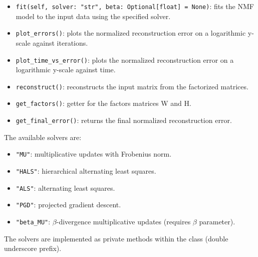 \begin{itemize}
    \item \texttt{fit(self, solver: "str", beta: Optional[float] = None)}: fits the NMF model to the input data using the specified solver.
    \item \texttt{plot\_errors()}: plots the normalized reconstruction error on a logarithmic y-scale against iterations.
    \item \texttt{plot\_time\_vs\_error()}: plots the normalized reconstruction error on a logarithmic y-scale against time.
    \item \texttt{reconstruct()}: reconstructs the input matrix from the factorized matrices.
    \item \texttt{get\_factors()}: getter for the factors matrices W and H.
    \item \texttt{get\_final\_error()}: returns the final normalized reconstruction error.
\end{itemize}
The available solvers are:
\begin{itemize}
    \item \texttt{"MU"}: multiplicative updates with Frobenius norm.
    \item \texttt{"HALS"}: hierarchical alternating least squares.
    \item \texttt{"ALS"}: alternating least squares.
    \item \texttt{"PGD"}: projected gradient descent.
    \item \texttt{"beta\_MU"}: $\beta$-divergence multiplicative updates (requires $\beta$ parameter).
\end{itemize}
The solvers are implemented as private methods within the class (double underscore prefix).
